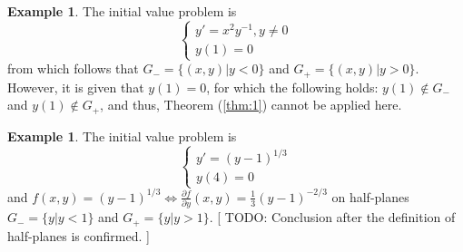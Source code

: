 \documentclass[10pt,a4paper]{article}
\theoremstyle{definition}
\newtheorem{example}[defn]{Example}
\begin{document}
\begin{example}
The initial value problem is
\[
  \left \{
  \begin{array}{ll}
    y' = x^2 y^{-1}, y \neq 0 \\
    y(1) = 0
  \end{array}
  \right.
\]
from which follows that $G_- = \{ (x, y) | y < 0 \}$ and $G_+ = \{ (x, y) | y >
0 \}$. However, it is given that $y(1) = 0$, for which the following holds:
$y(1) \notin G_-$ and $y(1) \notin G_+$, and thus, Theorem (\ref{thm:1}) cannot
be applied here.
\end{example}
\begin{example}
The initial value problem is
\[
  \left \{
  \begin{array}{ll}
    y' = (y - 1)^{1/3} \\
    y(4) = 0
  \end{array}
  \right.
\]
and $f(x, y) = (y - 1)^{1/3} \Leftrightarrow \frac{\partial f}{\partial y}(x,
y) = \frac{1}{3}(y - 1)^{-2/3}$ on half-planes $G_- = \{ y | y < 1 \}$ and $G_+
= \{ y | y > 1 \}$. [ TODO: Conclusion after the definition of half-planes is
confirmed. ]
\end{example}
\end{document}

